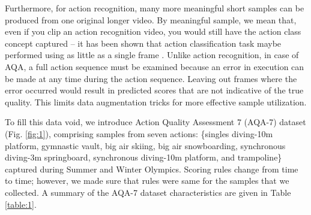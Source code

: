 \documentclass[10pt,twocolumn,letterpaper]{article}
\begin{document}
Furthermore, for action recognition, many more meaningful short samples can be produced from one original longer video. By meaningful sample, we mean that, even if you clip an action recognition video, you would still have the action class concept captured -- it has been shown that action classification task maybe performed using as little as a single frame \cite{sports1m}. Unlike action recognition, in case of AQA, a full action sequence must be examined because an error in execution can be made at any time during the action sequence.  Leaving out frames where the error occurred would result in predicted scores that are not indicative of the true quality.  This limits data augmentation tricks for more effective sample utilization. 

To fill this data void, we introduce Action Quality Assessment 7 (AQA-7) dataset (Fig. \ref{fig:1}), comprising samples from seven actions: \{singles diving-10m platform, gymnastic vault, big air skiing, big air snowboarding, synchronous diving-3m springboard, synchronous diving-10m platform, and trampoline\} captured during Summer and Winter Olympics. Scoring rules change from time to time; however, we made sure that rules were same for the samples that we collected. A summary of the AQA-7 dataset characteristics are given in Table \ref{table:1}. \\ 
\end{document}
